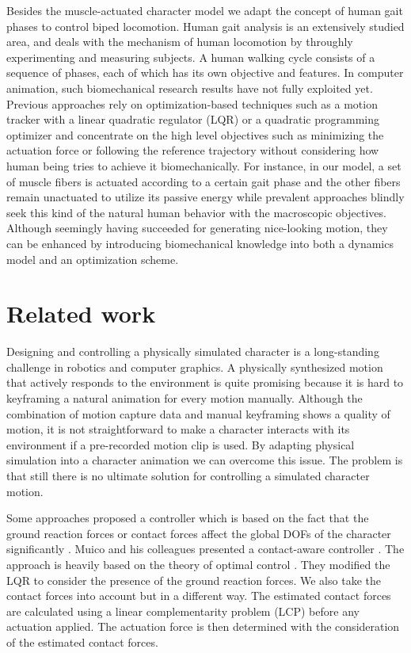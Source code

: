 \documentclass[master,english,final]{kaist-ucs}
\begin{document}
Besides the muscle-actuated character model we adapt the concept of
human gait phases to control biped locomotion. Human gait analysis is an extensively
studied area, and deals with the mechanism of human locomotion
by throughly experimenting and measuring subjects.
A human walking cycle consists of a sequence of phases, each of which has
its own objective and features.
In computer animation, such biomechanical research results have not fully exploited yet.
Previous approaches rely on optimization-based
techniques such as a motion tracker with a linear quadratic regulator (LQR)
or a quadratic programming optimizer and concentrate on the high level
objectives such as minimizing the actuation force or following the reference
trajectory without considering how human being tries
to achieve it biomechanically. For instance, in our model, a set of muscle fibers is
actuated according to a certain gait phase and the other fibers remain
unactuated to utilize its passive energy while prevalent approaches blindly seek
this kind of the natural human behavior with the macroscopic objectives.
Although seemingly having succeeded for generating nice-looking motion,
they can be enhanced by introducing biomechanical knowledge into both
a dynamics model and an optimization scheme.


\chapter{Related work}
Designing and controlling a physically simulated character is a long-standing
challenge in robotics and computer graphics. A physically
synthesized motion that actively responds to the environment is quite
promising because it is hard to keyframing a natural animation for every motion
manually. Although the combination of motion capture data and manual keyframing
shows a quality of motion, it is not straightforward to make a character
interacts with its environment if a pre-recorded motion clip is used.
By adapting physical simulation into a character animation we can overcome
this issue. The problem is that still there is no ultimate solution for controlling
a simulated character motion.

Some approaches proposed a controller which is based on the fact
that the ground reaction forces or contact forces affect the global
DOFs of the character significantly \cite{SCA07:249-258:2007, journals/tog/MuicoLPP09}.
Muico and his colleagues
presented a contact-aware controller \cite{journals/tog/MuicoLPP09}.
The approach is
heavily based on the theory of optimal control \cite{lewis}.
They modified the LQR to consider the presence of the ground reaction forces.
We also take the contact forces into account but in a different way.
The estimated contact forces are calculated using a linear complementarity
problem (LCP) before any actuation applied. The actuation force is then
determined with the consideration of the estimated contact forces.
\end{document}
